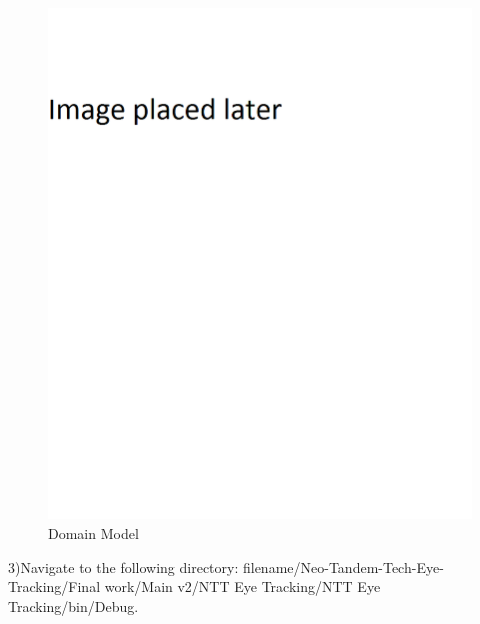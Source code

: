	\begin{figure}[!ht]
		\centering
		\includegraphics[scale=0.5, width=15cm, keepaspectratio]{./Images/default.png}
		\caption{Domain Model}
		\label{Unzip files}
	\end{figure}

3)Navigate to the following directory: filename/Neo-Tandem-Tech-Eye-Tracking/Final work/Main v2/NTT Eye Tracking/NTT Eye Tracking/bin/Debug.

